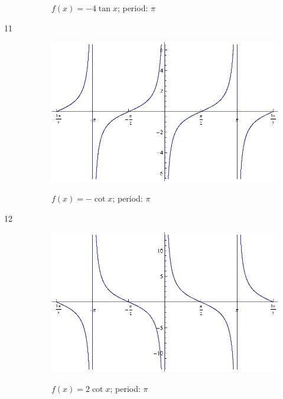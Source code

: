 \documentclass{exam}
\begin{document}
\begin{description}
\begin{figure}[H]
          $f(x) = -4 \tan x$; period: $\pi$
        \end{figure}

      \item[11]
        \begin{figure}[H]
          \centering
          \includegraphics[scale=0.9]{exercise11.eps}

          $f(x) = - \cot x$; period: $\pi$
        \end{figure}

      \item[12]
        \begin{figure}[H]
          \centering
          \includegraphics[scale=0.9]{exercise12.eps}

          $f(x) = 2 \cot x$; period: $\pi$
        \end{figure}


\end{description}
\end{document}
